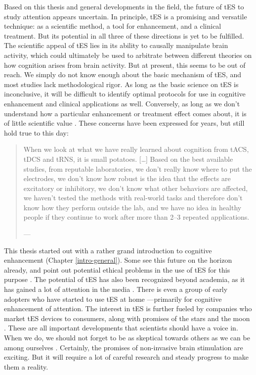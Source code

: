 \documentclass[11pt,english,]{memoir}
\begin{document}
Based on this thesis and general developments in the field, the future of tES to study attention appears uncertain. In principle, tES is a promising and versatile technique: as a scientific method, a tool for enhancement, and a clinical treatment. But its potential in all three of these directions is yet to be fulfilled. The scientific appeal of tES lies in its ability to causally manipulate brain activity, which could ultimately be used to arbitrate between different theories on how cognition arises from brain activity. But at present, this seems to be out of reach. We simply do not know enough about the basic mechanism of tES, and most studies lack methodological rigor. As long as the basic science on tES is inconclusive, it will be difficult to identify optimal protocols for use in cognitive enhancement and clinical applications as well. Conversely, as long as we don't understand how a particular enhancement or treatment effect comes about, it is of little scientific value \autocite{Duecker2014}. These concerns have been expressed for years, but still hold true to this day:

\begin{quote}
When we look at what we have really learned about cognition from tACS, tDCS and tRNS, it is small potatoes. {[}\ldots{}{]} Based on the best available studies, from reputable laboratories, we don't really know where to put the electrodes, we don't know how robust is the idea that the effects are excitatory or inhibitory, we don't know what other behaviors are affected, we haven't tested the methods with real-world tasks and therefore don't know how they perform outside the lab, and we have no idea in healthy people if they continue to work after more than 2--3 repeated applications.

--- \textcite{Walsh2013}
\end{quote}

This thesis started out with a rather grand introduction to cognitive enhancement (Chapter \ref{intro-general}). Some see this future on the horizon already, and point out potential ethical problems in the use of tES for this purpose \autocite{CohenKadosh2012}. The potential of tES has also been recognized beyond academia, as it has gained a lot of attention in the media \autocite{Dubljevic2014}. There is even a group of early adopters who have started to use tES at home \autocite{Jwa2015}---primarily for cognitive enhancement of attention. The interest in tES is further fueled by companies who market tES devices to consumers, along with promises of the stars and the moon \autocite{Santarnecchi2013b}. These are all important developments that scientists should have a voice in. When we do, we should not forget to be as skeptical towards others as we can be among ourselves \autocites{Riggall2015}{Steenbergen2016}{Walsh2013}{Wurzman2016}. Certainly, the promises of non-invasive brain stimulation are exciting. But it will require a lot of careful research and steady progress to make them a reality.
\end{document}
